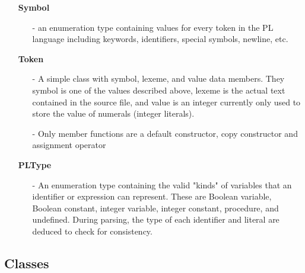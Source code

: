 \documentclass{article}
\begin{document}
\begin{itemize}
    \item[] \textbf{Symbol}
        \begin{itemize}
            \item[-] an enumeration type containing values for every  token in the PL language including keywords, identifiers, special symbols, newline, etc.
        \end{itemize} 
    \item[] \textbf{Token} 
        \begin{itemize}
            \item[-] A simple class with symbol, lexeme, and value data members. They symbol is one of the values described above, lexeme is the actual text contained in the source file, and value is an integer currently only used to store the value of numerals (integer literals).
        \item[-] Only member functions are a default constructor, copy constructor and assignment operator 
        \end{itemize} 
    \item[] \textbf{PLType}
        \begin{itemize}
            \item[-] An enumeration type containing the valid "kinds" of variables that an identifier or expression can represent. These are Boolean variable, Boolean constant, integer variable, integer constant, procedure, and undefined. During parsing, the type of each identifier and literal are deduced to check for consistency.
        \end{itemize}
\end{itemize}

\subsection*{Classes}
\end{document}
